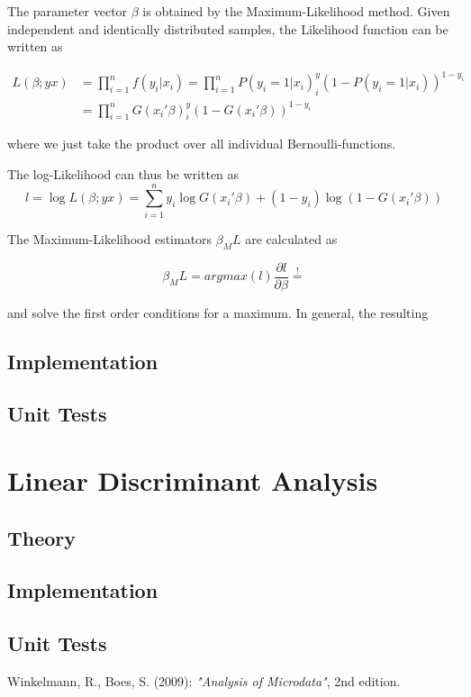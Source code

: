 \documentclass{article}
\begin{document}
The parameter vector $\beta$ is obtained by the Maximum-Likelihood method. Given independent and identically distributed samples, the Likelihood function can be written as

\begin{equation}
\begin{split}
L(\beta;y x) &= \prod_{i=1}^{n} f(y_i | x_i)
              =\prod_{i=1}^{n} P(y_i=1|x_i)^y_i\left(1-P(y_i=1|x_i)\right)^{1-y_i} \\
            & =\prod_{i=1}^{n} G(x_i\prime \beta)^y_i\left(1-G(x_i\prime \beta)\right)^{1-y_i}
\end{split}
\end{equation}

where we just take the product over all individual Bernoulli-functions.

The log-Likelihood can thus be written as
\begin{equation}
\label{logL}
l = \log L(\beta;y x) = \sum_{i=1}^{n} y_i \log G(x_i\prime \beta) +(1-y_i) \log (1-G(x_i\prime \beta))
\end{equation}

The Maximum-Likelihood estimators $\beta_ML$ are calculated as

\begin{equation}
\beta_ML = argmax(l)
\frac{\partial l}{\partial \beta} \stackrel{!}{=}
\end{equation}

and solve the first order conditions for a maximum. In general, the resulting
\subsection{Implementation}

\subsection{Unit Tests}


\section{Linear Discriminant Analysis}
\subsection{Theory}

\subsection{Implementation}

\subsection{Unit Tests}

\begin{thebibliography}{9}
  Winkelmann, R., Boes, S. (2009): \textit{"Analysis of Microdata"}, 2nd edition.
\end{thebibliography}
\end{document}
